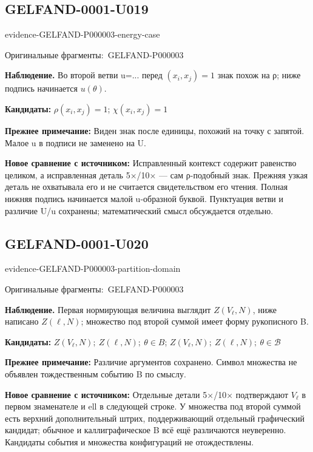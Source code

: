 \documentclass[11pt]{article}
\newcommand{\EvidenceBlock}[4]{%
 \par\smallskip\noindent\begin{minipage}{\linewidth}
 \begin{minipage}[t]{.47\linewidth}\vspace{0pt}\centering
 \csname evidence-#1-#2\endcsname\par
 {\scriptsize\SourceCropCaption\ #1}\par
 \end{minipage}\hfill
 \begin{minipage}[t]{.49\linewidth}\vspace{0pt}\raggedright
 {\small\color{orange!65!black}\textbf{#4} #3}\par
 \end{minipage}
 \end{minipage}\par\smallskip}
\newcommand{\SourceCropCaption}{Оригинальные фрагменты:}\newcommand{\ReadingCaption}{Сомнительное чтение.}\newcommand{\IncompleteCaption}{Неразобранный фрагмент.}\newcommand{\DiagramCaption}{Рисунок и набранное описание.}
\begin{document}
\subsection*{GELFAND-0001-U019}
\EvidenceBlock{GELFAND-P000003}{energy-case}{Во второй ветви u=... перед \((x_i,x_j)=1\) знак похож на ρ; ниже подпись начинается \(u(\theta)\).}{Наблюдение.}
\par\smallskip\noindent\textbf{Кандидаты: } \(\rho(x_i,x_j)=1\); \(\chi(x_i,x_j)=1\)\par
\par\smallskip\noindent\textbf{Прежнее примечание: } Виден знак после единицы, похожий на точку с запятой. Малое u в подписи не заменено на U.\par
\par\smallskip\noindent\textbf{Новое сравнение с источником: } Исправленный контекст содержит равенство целиком, а исправленная деталь 5×/10× — сам ρ-подобный знак. Прежняя узкая деталь не охватывала его и не считается свидетельством его чтения. Полная нижняя подпись начинается малой u-образной буквой. Пунктуация ветви и различие U/u сохранены; математический смысл обсуждается отдельно.\par

\subsection*{GELFAND-0001-U020}
\EvidenceBlock{GELFAND-P000003}{partition-domain}{Первая нормирующая величина выглядит \(Z(V_\ell,N)\), ниже написано \(Z(\ell,N)\); множество под второй суммой имеет форму рукописного B.}{Наблюдение.}
\par\smallskip\noindent\textbf{Кандидаты: } \(Z(V_\ell,N);\ Z(\ell,N);\ \theta\in B\); \(Z(V_\ell,N);\ Z(\ell,N);\ \theta\in\mathcal B\)\par
\par\smallskip\noindent\textbf{Прежнее примечание: } Различие аргументов сохранено. Символ множества не объявлен тождественным событию B по смыслу.\par
\par\smallskip\noindent\textbf{Новое сравнение с источником: } Отдельные детали 5×/10× подтверждают \(V_\ell\) в первом знаменателе и ell в следующей строке. У множества под второй суммой есть верхний дополнительный штрих, поддерживающий отдельный графический кандидат; обычное и каллиграфическое B всё ещё различаются неуверенно. Кандидаты события и множества конфигураций не отождествлены.\par
\end{document}
